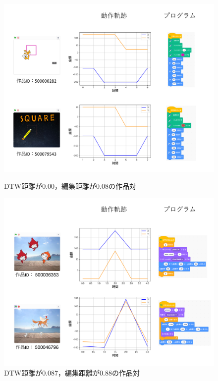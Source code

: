 \documentclass[T,J]{fose} %
\begin{document}
\begin{figure}[t]
  \begin{minipage}[b]{0.45\linewidth}
    \centering
	\includegraphics[width=1.0\linewidth]{Okamoto_fig/quadrant-3.pdf}
	\caption{DTW距離が0.00，編集距離が0.08の作品対}
	\label{fig:distance-boxplot3}
  \end{minipage}
  \begin{minipage}[b]{0.45\linewidth}
    \centering
	\includegraphics[width=1.0\linewidth]{Okamoto_fig/quadrant-4.pdf}
	\caption{DTW距離が0.087，編集距離が0.88の作品対}
	\label{fig:distance-boxplot4}
  \end{minipage}
\end{figure}
\end{document}
